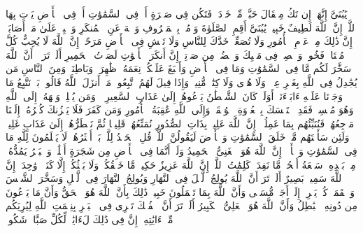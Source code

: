 \stopbuffer
\startbuffer[\q:31:16]
یَٰبُنَیَّ إِنَّهَاۤ إِن تَكُ مِثۡقَالَ حَبَّةࣲ مِّنۡ خَرۡدَلࣲ فَتَكُن فِی صَخۡرَةٍ أَوۡ فِی ٱلسَّمَٰوَٰتِ أَوۡ فِی ٱلۡأَرۡضِ یَأۡتِ بِهَا ٱللَّهُۚ إِنَّ ٱللَّهَ لَطِیفٌ خَبِیرࣱ%
\stopbuffer
\startbuffer[\q:31:17]
یَٰبُنَیَّ أَقِمِ ٱلصَّلَوٰةَ وَأۡمُرۡ بِٱلۡمَعۡرُوفِ وَٱنۡهَ عَنِ ٱلۡمُنكَرِ وَٱصۡبِرۡ عَلَىٰ مَاۤ أَصَابَكَۖ إِنَّ ذَٰلِكَ مِنۡ عَزۡمِ ٱلۡأُمُورِ%
\stopbuffer
\startbuffer[\q:31:18]
وَلَا تُصَعِّرۡ خَدَّكَ لِلنَّاسِ وَلَا تَمۡشِ فِی ٱلۡأَرۡضِ مَرَحًاۖ إِنَّ ٱللَّهَ لَا یُحِبُّ كُلَّ مُخۡتَالࣲ فَخُورࣲ%
\stopbuffer
\startbuffer[\q:31:19]
وَٱقۡصِدۡ فِی مَشۡیِكَ وَٱغۡضُضۡ مِن صَوۡتِكَۚ إِنَّ أَنكَرَ ٱلۡأَصۡوَٰتِ لَصَوۡتُ ٱلۡحَمِیرِ%
\stopbuffer
\startbuffer[\q:31:20]
أَلَمۡ تَرَوۡا۟ أَنَّ ٱللَّهَ سَخَّرَ لَكُم مَّا فِی ٱلسَّمَٰوَٰتِ وَمَا فِی ٱلۡأَرۡضِ وَأَسۡبَغَ عَلَیۡكُمۡ نِعَمَهُۥ ظَٰهِرَةࣰ وَبَاطِنَةࣰۗ وَمِنَ ٱلنَّاسِ مَن یُجَٰدِلُ فِی ٱللَّهِ بِغَیۡرِ عِلۡمࣲ وَلَا هُدࣰى وَلَا كِتَٰبࣲ مُّنِیرࣲ%
\stopbuffer
\startbuffer[\q:31:21]
وَإِذَا قِیلَ لَهُمُ ٱتَّبِعُوا۟ مَاۤ أَنزَلَ ٱللَّهُ قَالُوا۟ بَلۡ نَتَّبِعُ مَا وَجَدۡنَا عَلَیۡهِ ءَابَاۤءَنَاۤۚ أَوَلَوۡ كَانَ ٱلشَّیۡطَٰنُ یَدۡعُوهُمۡ إِلَىٰ عَذَابِ ٱلسَّعِیرِ%
\stopbuffer
\startbuffer[\q:31:22]
۞ وَمَن یُسۡلِمۡ وَجۡهَهُۥۤ إِلَى ٱللَّهِ وَهُوَ مُحۡسِنࣱ فَقَدِ ٱسۡتَمۡسَكَ بِٱلۡعُرۡوَةِ ٱلۡوُثۡقَىٰۗ وَإِلَى ٱللَّهِ عَٰقِبَةُ ٱلۡأُمُورِ%
\stopbuffer
\startbuffer[\q:31:23]
وَمَن كَفَرَ فَلَا یَحۡزُنكَ كُفۡرُهُۥۤۚ إِلَیۡنَا مَرۡجِعُهُمۡ فَنُنَبِّئُهُم بِمَا عَمِلُوۤا۟ۚ إِنَّ ٱللَّهَ عَلِیمُۢ بِذَاتِ ٱلصُّدُورِ%
\stopbuffer
\startbuffer[\q:31:24]
نُمَتِّعُهُمۡ قَلِیلࣰا ثُمَّ نَضۡطَرُّهُمۡ إِلَىٰ عَذَابٍ غَلِیظࣲ%
\stopbuffer
\startbuffer[\q:31:25]
وَلَئِن سَأَلۡتَهُم مَّنۡ خَلَقَ ٱلسَّمَٰوَٰتِ وَٱلۡأَرۡضَ لَیَقُولُنَّ ٱللَّهُۚ قُلِ ٱلۡحَمۡدُ لِلَّهِۚ بَلۡ أَكۡثَرُهُمۡ لَا یَعۡلَمُونَ%
\stopbuffer
\startbuffer[\q:31:26]
لِلَّهِ مَا فِی ٱلسَّمَٰوَٰتِ وَٱلۡأَرۡضِۚ إِنَّ ٱللَّهَ هُوَ ٱلۡغَنِیُّ ٱلۡحَمِیدُ%
\stopbuffer
\startbuffer[\q:31:27]
وَلَوۡ أَنَّمَا فِی ٱلۡأَرۡضِ مِن شَجَرَةٍ أَقۡلَٰمࣱ وَٱلۡبَحۡرُ یَمُدُّهُۥ مِنۢ بَعۡدِهِۦ سَبۡعَةُ أَبۡحُرࣲ مَّا نَفِدَتۡ كَلِمَٰتُ ٱللَّهِۚ إِنَّ ٱللَّهَ عَزِیزٌ حَكِیمࣱ%
\stopbuffer
\startbuffer[\q:31:28]
مَّا خَلۡقُكُمۡ وَلَا بَعۡثُكُمۡ إِلَّا كَنَفۡسࣲ وَٰحِدَةٍۚ إِنَّ ٱللَّهَ سَمِیعُۢ بَصِیرٌ%
\stopbuffer
\startbuffer[\q:31:29]
أَلَمۡ تَرَ أَنَّ ٱللَّهَ یُولِجُ ٱلَّیۡلَ فِی ٱلنَّهَارِ وَیُولِجُ ٱلنَّهَارَ فِی ٱلَّیۡلِ وَسَخَّرَ ٱلشَّمۡسَ وَٱلۡقَمَرَۖ كُلࣱّ یَجۡرِیۤ إِلَىٰۤ أَجَلࣲ مُّسَمࣰّى وَأَنَّ ٱللَّهَ بِمَا تَعۡمَلُونَ خَبِیرࣱ%
\stopbuffer
\startbuffer[\q:31:30]
ذَٰلِكَ بِأَنَّ ٱللَّهَ هُوَ ٱلۡحَقُّ وَأَنَّ مَا یَدۡعُونَ مِن دُونِهِ ٱلۡبَٰطِلُ وَأَنَّ ٱللَّهَ هُوَ ٱلۡعَلِیُّ ٱلۡكَبِیرُ%
\stopbuffer
\startbuffer[\q:31:31]
أَلَمۡ تَرَ أَنَّ ٱلۡفُلۡكَ تَجۡرِی فِی ٱلۡبَحۡرِ بِنِعۡمَتِ ٱللَّهِ لِیُرِیَكُم مِّنۡ ءَایَٰتِهِۦۤۚ إِنَّ فِی ذَٰلِكَ لَءَایَٰتࣲ لِّكُلِّ صَبَّارࣲ شَكُورࣲ%
\stopbuffer

